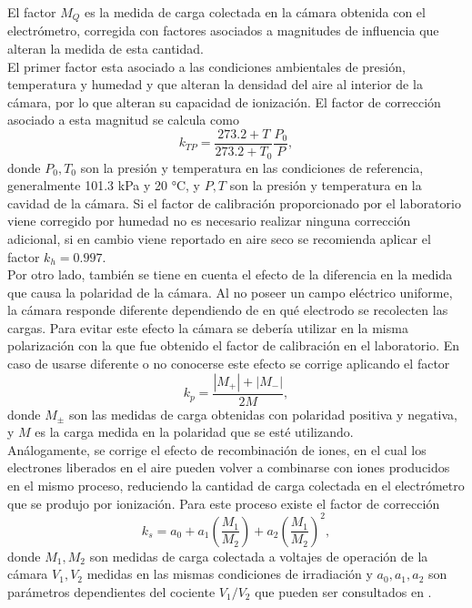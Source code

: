 El factor $M_{Q}$ es la medida de carga colectada en la cámara obtenida con el electrómetro, corregida con factores asociados a  magnitudes de influencia que alteran la medida de esta cantidad.\\

El primer factor esta asociado a las condiciones ambientales de presión, temperatura y humedad y que alteran la densidad del aire al interior de la cámara, por lo que alteran su capacidad de ionización. El factor de corrección asociado a esta magnitud se calcula como 
\begin{equation}
	k_{TP}=\frac{273.2+T}{273.2+T_0}\frac{P_0}{P},
\end{equation}
donde $P_0,T_0$ son la presión y temperatura en las condiciones de referencia, generalmente 101.3 kPa y 20 °C, y $P,T$ son la presión y temperatura en la cavidad de la cámara. Si el factor de calibración proporcionado por el laboratorio viene corregido por humedad no es necesario realizar ninguna corrección adicional, si en cambio viene reportado en aire seco se recomienda aplicar el factor $k_{h}=0.997$.\\

Por otro lado, también se tiene en cuenta el efecto de la diferencia en la medida que causa la polaridad de la cámara. Al no poseer un campo eléctrico uniforme, la cámara responde diferente dependiendo de en qué electrodo se recolecten las cargas. Para evitar este efecto la cámara se debería utilizar en la misma polarización con la que fue obtenido el factor de calibración en el laboratorio. En caso de usarse diferente o no conocerse este efecto se corrige aplicando el factor
\begin{equation}
	k_{p}=\frac{|M_{+}|+|M_{-}|}{2M},
\end{equation}
donde $M_{\pm}$ son las medidas de carga obtenidas con polaridad positiva y negativa, y $M$ es la carga medida en la polaridad que se esté utilizando.\\

Análogamente, se corrige el efecto de recombinación de iones, en el cual los electrones liberados en el aire pueden volver a combinarse con iones producidos en el mismo proceso, reduciendo la cantidad de carga colectada en el electrómetro que se produjo por ionización. Para este proceso existe el factor de corrección
\begin{equation}
	k_s=a_0+a_1\left(\frac{M_1}{M_2}\right)+a_2\left(\frac{M_1}{M_2}\right)^2,
\end{equation}  
donde $M_1,M_2$ son medidas de carga colectada a voltajes de operación de la cámara  $V_1,V_2$ medidas en las mismas condiciones de irradiación y $a_0,a_1,a_2$ son parámetros dependientes del cociente $V_1/V_2$ que pueden ser consultados en \cite{TPR398}.\\

